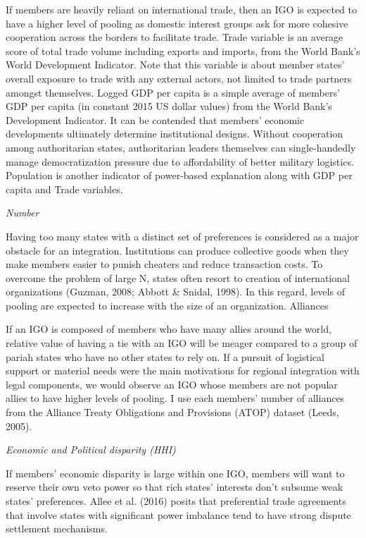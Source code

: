\documentclass[12pt]{article}
\begin{document}
\begin{itemize}
If members are heavily reliant on international trade, then an IGO is expected to have a higher level of pooling as domestic interest groups ask for more cohesive cooperation across the borders to facilitate trade. Trade variable is an average score of total trade volume including exports and imports, from the World Bank’s World Development Indicator. Note that this variable is about member states’ overall exposure to trade with any external actors, not limited to trade partners amongst themselves. Logged GDP per capita is a simple average of members’ GDP per capita (in constant 2015 US dollar values) from the World Bank’s Development Indicator. It can be contended that members’ economic developments ultimately determine institutional designs. Without cooperation among authoritarian states, authoritarian leaders themselves can single-handedly manage democratization pressure due to affordability of better military logistics. Population is another indicator of power-based explanation along with GDP per capita and Trade variables. 

\textit{Number}

Having too many states with a distinct set of preferences is considered as a major obstacle for an integration. Institutions can produce collective goods when they make members easier to punish cheaters and reduce transaction costs. To overcome the problem of large N, states often resort to creation of international organizations (Guzman, 2008; Abbott \& Snidal, 1998). In this regard, levels of pooling are expected to increase with the size of an organization. 
Alliances

If an IGO is composed of members who have many allies around the world, relative value of having a tie with an IGO will be meager compared to a group of pariah states who have no other states to rely on. If a pursuit of logistical support or material needs were the main motivations for regional integration with legal components, we would observe an IGO whose members are not popular allies to have higher levels of pooling. I use each members’ number of alliances from the Alliance Treaty Obligations and Provisions (ATOP) dataset (Leeds, 2005). 

\textit{Economic and Political disparity (HHI)}

If members’ economic disparity is large within one IGO, members will want to reserve their own veto power so that rich states’ interests don’t subsume weak states’ preferences. Allee et al. (2016) posits that preferential trade agreements that involve states with significant power imbalance tend to have strong dispute settlement mechanisms. 


\end{itemize}
\end{document}

